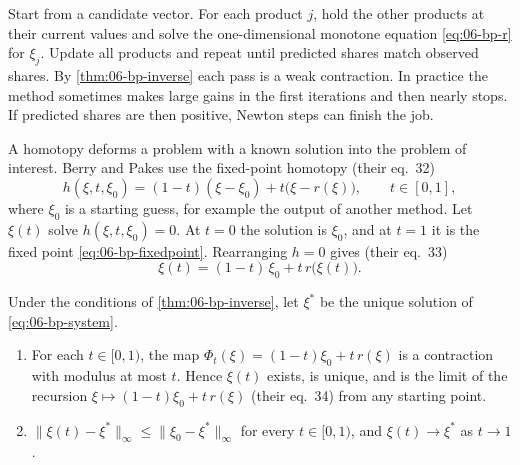 Start from a candidate vector. For each product $j$, hold the other products at their current values and solve the
one-dimensional monotone equation \eqref{eq:06-bp-r} for $\xi_j$. Update all products and repeat until predicted shares
match observed shares. By \cref{thm:06-bp-inverse} each pass is a weak contraction. In practice the method sometimes
makes large gains in the first iterations and then nearly stops. If predicted shares are then positive, Newton steps can
finish the job.

A homotopy deforms a problem with a known solution into the problem of interest. Berry and Pakes use the fixed-point
homotopy (their eq.~32)
\begin{equation}\label{eq:06-homotopy}
  h(\xi, t, \xi_0) = (1 - t)(\xi - \xi_0) + t\bigl(\xi - r(\xi)\bigr), \qquad t \in [0, 1],
\end{equation}
where $\xi_0$ is a starting guess, for example the output of another method. Let $\xi(t)$ solve $h(\xi, t, \xi_0) = 0$.
At $t = 0$ the solution is $\xi_0$, and at $t = 1$ it is the fixed point \eqref{eq:06-bp-fixedpoint}. Rearranging $h = 0$
gives (their eq.~33)
\begin{equation}\label{eq:06-homotopy33}
  \xi(t) = (1 - t)\,\xi_0 + t\, r\bigl(\xi(t)\bigr) .
\end{equation}

\begin{proposition}\label{prop:06-homotopy}
Under the conditions of \cref{thm:06-bp-inverse}, let $\xi^*$ be the unique solution of \eqref{eq:06-bp-system}.
\begin{enumerate}[label=(\roman*)]
\item For each $t \in [0, 1)$, the map $\Phi_t(\xi) = (1 - t)\xi_0 + t\, r(\xi)$ is a contraction with modulus at most $t$.
Hence $\xi(t)$ exists, is unique, and is the limit of the recursion $\xi \mapsto (1-t)\xi_0 + t\,r(\xi)$ (their eq.~34)
from any starting point.
\item $\lVert \xi(t) - \xi^* \rVert_\infty \le \lVert \xi_0 - \xi^* \rVert_\infty$ for every $t \in [0,1)$, and $\xi(t) \to
\xi^*$ as $t \to 1$.
\end{enumerate}
\end{proposition}

